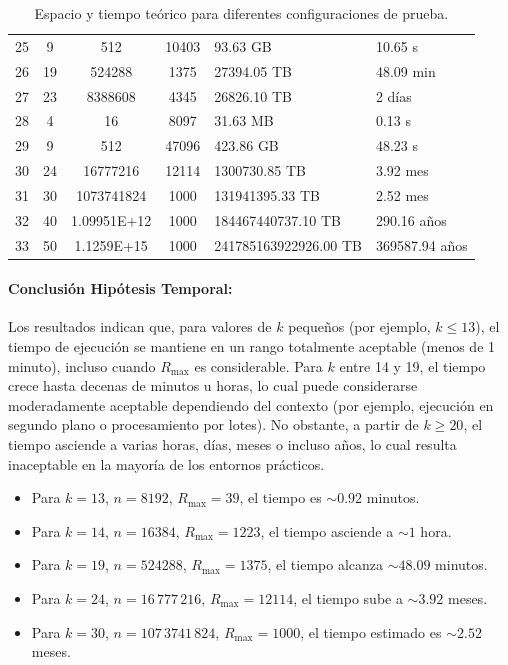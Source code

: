 \documentclass[11pt,letter]{article}
\begin{document}
\begin{itemize}
\begin{table}[H]
\begin{tabular}{|c|c|c|c|l|l|}
25 & 9  & 512     & 10403  & 93.63 GB       & 10.65 s \\
26 & 19 & 524288  & 1375   & 27394.05 TB    & 48.09 min \\
27 & 23 & 8388608 & 4345   & 26826.10 TB    & 2 días \\
28 & 4  & 16      & 8097   & 31.63 MB       & 0.13 s \\
29 & 9  & 512     & 47096  & 423.86 GB      & 48.23 s \\
30 & 24 & 16777216 & 12114 & 1300730.85 TB  & 3.92 mes \\
31 & 30 & 1073741824 & 1000 & 131941395.33 TB & 2.52 mes \\
32 & 40 & 1.09951E+12 & 1000 & 184467440737.10 TB & 290.16 años \\
33 & 50 & 1.1259E+15 & 1000 & 241785163922926.00 TB & 369587.94 años \\
\hline
\end{tabular}
    \caption{Espacio y tiempo teórico para diferentes configuraciones de prueba.}
    \end{table}



\paragraph{Conclusión Hipótesis Temporal:}
Los resultados indican que, para valores de \(k\) pequeños (por ejemplo, \(k \le 13\)), el tiempo de ejecución se mantiene en un rango totalmente aceptable (menos de 1 minuto), incluso cuando \(R_{\max}\) es considerable. Para \(k\) entre 14 y 19, el tiempo crece hasta decenas de minutos u horas, lo cual puede considerarse moderadamente aceptable dependiendo del contexto (por ejemplo, ejecución en segundo plano o procesamiento por lotes). No obstante, a partir de \(k \ge 20\), el tiempo asciende a varias horas, días, meses o incluso años, lo cual resulta inaceptable en la mayoría de los entornos prácticos.

\begin{itemize}
  \item Para \(k=13\), \(n=8192\), \(R_{\max}=39\), el tiempo es \(\sim0.92\) minutos.
  \item Para \(k=14\), \(n=16384\), \(R_{\max}=1223\), el tiempo asciende a \(\sim1\) hora.
  \item Para \(k=19\), \(n=524288\), \(R_{\max}=1375\), el tiempo alcanza \(\sim48.09\) minutos.
  \item Para \(k=24\), \(n=16\,777\,216\), \(R_{\max}=12114\), el tiempo sube a \(\sim3.92\) meses.
  \item Para \(k=30\), \(n=107\,3741\,824\), \(R_{\max}=1000\), el tiempo estimado es \(\sim2.52\) meses.
\end{itemize}


\end{itemize}
\end{document}
